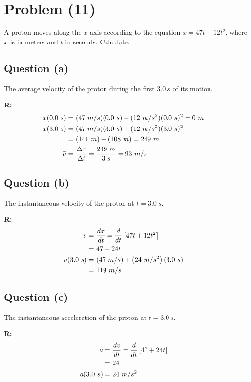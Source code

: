 \section{Problem (11)}
	A proton moves along the $x$ axis according to the equation $x = 47t + 12t^{2}$, where $x$ is in meters and $t$ in seconds. Calculate:

	\subsection{Question (a)}
		The average velocity of the proton during the first $3.0 \ s$ of its motion.

		\textbf{R:} \newline
		\begin{align}
			x(0.0 \ s) = \ &(47 \ m/s)(0.0 \ s) + (12 \ m/s^{2})(0.0 \ s)^{2} = 0 \ m& \notag \\
			x(3.0 \ s) = \ &(47 \ m/s)(3.0 \ s) + (12 \ m/s^{2})(3.0 \ s)^{2}& \notag \\
			= \ &(141 \ m) + (108 \ m) = 249 \ m& \notag \\
			\bar{v} = \ &\frac{\Delta x}{\Delta t} = \frac{249 \ m}{3 \ s} = 93 \ m/s&
		\end{align}

	\subsection{Question (b)}
		The instantaneous velocity of the proton at $t = 3.0 \ s$.

		\textbf{R:} \newline
		\begin{align}
			v = \ &\frac{dx}{dt} = \frac{d}{dt} \left[ 47t + 12t^{2} \right]& \notag \\
			= \ &47 + 24t& \notag \\
			v(3.0 \ s) = \ &(47 \ m/s) + \left( 24 \ m/s^{2} \right)(3.0 \ s)& \notag \\
			= \ &119 \ m/s&
		\end{align}

	\subsection{Question (c)}
		The instantaneous acceleration of the proton at $t = 3.0 \ s$.

		\textbf{R:} \newline
		\begin{align}
			a = \ &\frac{dv}{dt} = \frac{d}{dt} \left[ 47 + 24t \right]& \notag \\
			= \ &24& \notag \\
			a(3.0 \ s) = \ &24 \ m/s^{2}&
		\end{align}

